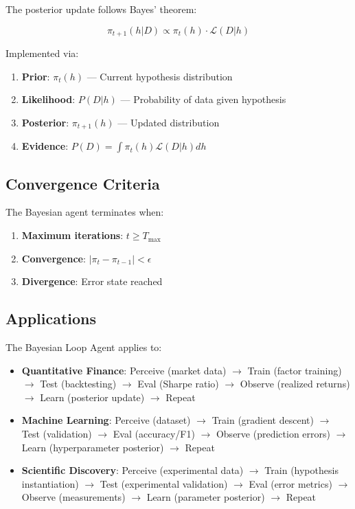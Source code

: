 \begin{definition}
The posterior update follows Bayes' theorem:

\[
\pi_{t+1}(h | D) \propto \pi_t(h) \cdot \mathcal{L}(D | h)
\]

Implemented via:
\begin{enumerate}
\item \textbf{Prior}: $\pi_t(h)$ --- Current hypothesis distribution
\item \textbf{Likelihood}: $P(D | h)$ --- Probability of data given hypothesis  
\item \textbf{Posterior}: $\pi_{t+1}(h)$ --- Updated distribution
\item \textbf{Evidence}: $P(D) = \int \pi_t(h) \mathcal{L}(D | h) dh$
\end{enumerate}
\end{definition}

\subsection{Convergence Criteria}

The Bayesian agent terminates when:

\begin{enumerate}
\item \textbf{Maximum iterations}: $t \ge T_{\text{max}}$
\item \textbf{Convergence}: $|\pi_t - \pi_{t-1}| < \epsilon$
\item \textbf{Divergence}: Error state reached
\end{enumerate}

\subsection{Applications}

The Bayesian Loop Agent applies to:

\begin{itemize}
\item \textbf{Quantitative Finance}: Perceive (market data) $\to$ Train (factor training) $\to$ Test (backtesting) $\to$ Eval (Sharpe ratio) $\to$ Observe (realized returns) $\to$ Learn (posterior update) $\to$ Repeat
\item \textbf{Machine Learning}: Perceive (dataset) $\to$ Train (gradient descent) $\to$ Test (validation) $\to$ Eval (accuracy/F1) $\to$ Observe (prediction errors) $\to$ Learn (hyperparameter posterior) $\to$ Repeat
\item \textbf{Scientific Discovery}: Perceive (experimental data) $\to$ Train (hypothesis instantiation) $\to$ Test (experimental validation) $\to$ Eval (error metrics) $\to$ Observe (measurements) $\to$ Learn (parameter posterior) $\to$ Repeat
\end{itemize}

